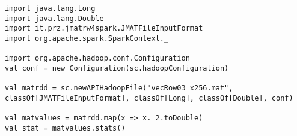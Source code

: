 \begin{lstlisting}[style=myScalaStyle]
import java.lang.Long
import java.lang.Double
import it.prz.jmatrw4spark.JMATFileInputFormat
import org.apache.spark.SparkContext._

import org.apache.hadoop.conf.Configuration
val conf = new Configuration(sc.hadoopConfiguration)

val matrdd = sc.newAPIHadoopFile("vecRow03_x256.mat", classOf[JMATFileInputFormat], classOf[Long], classOf[Double], conf)

val matvalues = matrdd.map(x => x._2.toDouble)
val stat = matvalues.stats()
\end{lstlisting}